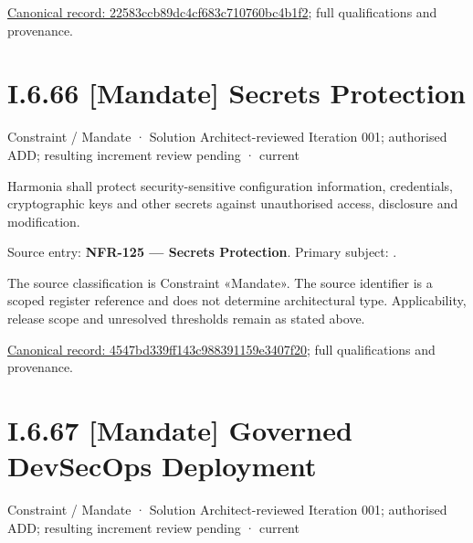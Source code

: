 {\footnotesize \href{../../../../../../../../continuum/motivation/constraint/mandate/22583ccb89dc4cf683c710760bc4b1f2.md}{Canonical record: 22583ccb89dc4cf683c710760bc4b1f2}; full qualifications and provenance.}\par
\section*{I.6.66 [Mandate] Secrets Protection}
\label{navigation:I.6.66}

\label{element:4547bd339ff143c988391159e3407f20}
{\small Constraint / Mandate · Solution Architect-reviewed Iteration 001; authorised ADD; resulting increment review pending · current}\par

Harmonia shall protect security-sensitive configuration information, credentials, cryptographic keys and other secrets against unauthorised access, disclosure and modification.



Source entry: \textbf{NFR-125 — Secrets Protection}. Primary subject: \texttt{}.



The source classification is Constraint «Mandate». The source identifier is a scoped register reference and does not determine architectural type. Applicability, release scope and unresolved thresholds remain as stated above.


{\footnotesize \href{../../../../../../../../continuum/motivation/constraint/mandate/4547bd339ff143c988391159e3407f20.md}{Canonical record: 4547bd339ff143c988391159e3407f20}; full qualifications and provenance.}\par
\section*{I.6.67 [Mandate] Governed DevSecOps Deployment}
\label{navigation:I.6.67}

\label{element:54eb7e671c094ebcbb5503af36c7892d}
{\small Constraint / Mandate · Solution Architect-reviewed Iteration 001; authorised ADD; resulting increment review pending · current}\par

